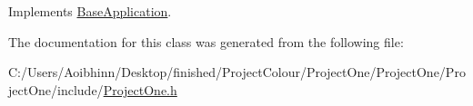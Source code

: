 Implements \hyperlink{class_base_application_aa97beeb4059b17d0ec22eae33286ec2d}{Base\-Application}.



The documentation for this class was generated from the following file\-:\begin{DoxyCompactItemize}
\item 
C\-:/\-Users/\-Aoibhinn/\-Desktop/finished/\-Project\-Colour/\-Project\-One/\-Project\-One/\-Project\-One/include/\hyperlink{_project_one_8h}{Project\-One.\-h}\end{DoxyCompactItemize}
